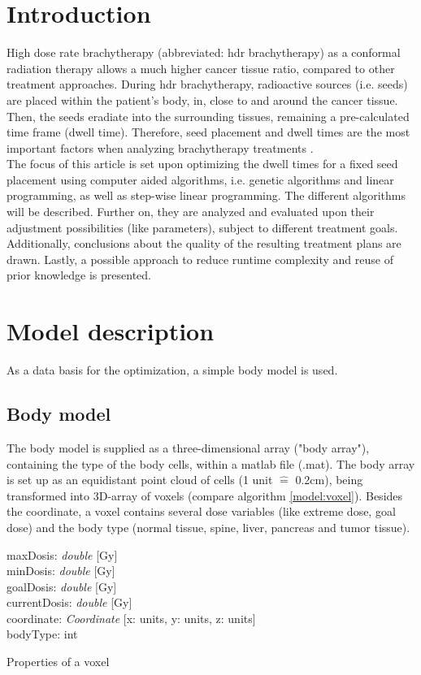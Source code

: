 \documentclass[12pt]{article}
\begin{document}


\tableofcontents
\newpage

\section{Introduction}
High dose rate brachytherapy (abbreviated: hdr brachytherapy) as a conformal radiation therapy allows a much higher cancer tissue ratio, compared to other treatment approaches. During hdr brachytherapy, radioactive sources (i.e. seeds) are placed within the patient's body, in, close to and around the cancer tissue. Then, the seeds eradiate into the surrounding tissues, remaining a pre-calculated time frame (dwell time). Therefore, seed placement and dwell times are the most important factors when analyzing brachytherapy treatments \cite{brachytherapy}. \\
The focus of this article is set upon optimizing the dwell times for a fixed seed placement using computer aided algorithms, i.e. genetic algorithms and linear programming, as well as step-wise linear programming. The different algorithms will be described. Further on, they are analyzed and evaluated upon their adjustment possibilities (like parameters), subject to different treatment goals. Additionally, conclusions about the quality of the resulting treatment plans are drawn. Lastly, a possible approach to reduce runtime complexity and reuse of prior knowledge is presented.

\section{Model description}
As a data basis for the optimization, a simple body model is used. 

\subsection{Body model}
The body model is supplied as a three-dimensional array ("body array"), containing the type of the body cells, within a matlab file (.mat). The body array is set up as an equidistant point cloud of cells (1 unit $\widehat{=}$ 0.2cm), being transformed into 3D-array of voxels (compare algorithm \ref{model:voxel}). Besides the coordinate, a voxel contains several dose variables (like extreme dose, goal dose) and the body type (normal tissue, spine, liver, pancreas and tumor tissue). \\
\begin{algorithm}[H]
maxDosis: \textit{double} [Gy] \\
minDosis: \textit{double} [Gy] \\
goalDosis: \textit{double} [Gy] \\
currentDosis: \textit{double} [Gy] \\
coordinate: \textit{Coordinate} [x: units, y: units, z: units] \\
bodyType: int
\label{model:voxel}
\caption{Properties of a voxel}
\end{algorithm}
\end{document}
